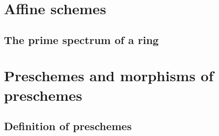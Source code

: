 \documentclass[10pt,oneside]{amsart}
\begin{document}
    \section{Affine schemes}
       
       \subsection{The prime spectrum of a ring}



    \section{Preschemes and morphisms of preschemes}

        \subsection{Definition of preschemes}
        
\end{document}

